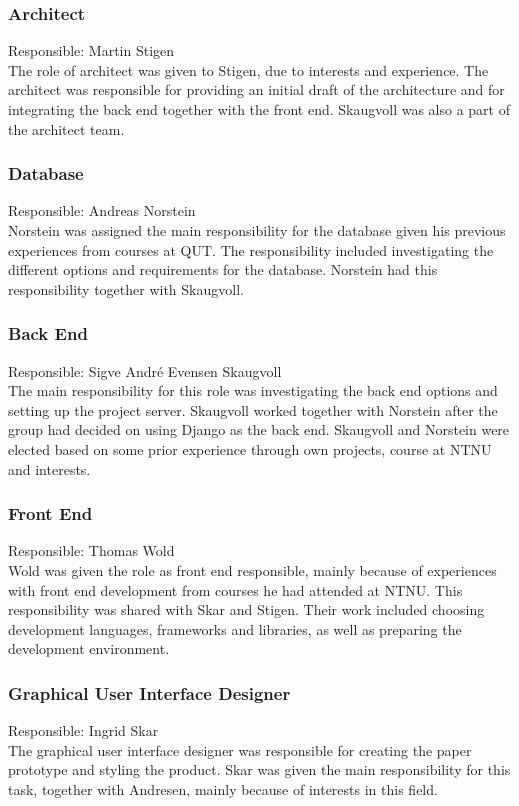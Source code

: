 \subsubsection{Architect}
Responsible: Martin Stigen \\
The role of architect was given to Stigen, due to interests and experience. The architect was responsible for providing an initial draft of the architecture and for integrating the back end together with the front end. Skaugvoll was also a part of the architect team.

\subsubsection{Database}
Responsible: Andreas Norstein\\
Norstein was assigned the main responsibility for the database given his previous experiences from courses at QUT. The responsibility included investigating the different options and requirements for the database. Norstein had this responsibility together with Skaugvoll.

\subsubsection{Back End}
Responsible: Sigve André Evensen Skaugvoll\\
The main responsibility for this role was investigating the back end options and setting up the project server. Skaugvoll worked together with Norstein after the group had decided on using Django as the back end. Skaugvoll and Norstein were elected based on some prior experience through own projects, course at NTNU and interests.

\subsubsection{Front End}
Responsible: Thomas Wold\\
Wold was given the role as front end responsible, mainly because of experiences with front end development from courses he had attended at NTNU. This responsibility was shared with Skar and Stigen. Their work included choosing development languages, frameworks and libraries, as well as preparing the development environment.

\subsubsection{Graphical User Interface Designer}
Responsible: Ingrid Skar\\
The graphical user interface designer was responsible for creating the paper prototype and styling the product. Skar was given the main responsibility for this task, together with Andresen, mainly because of interests in this field.


